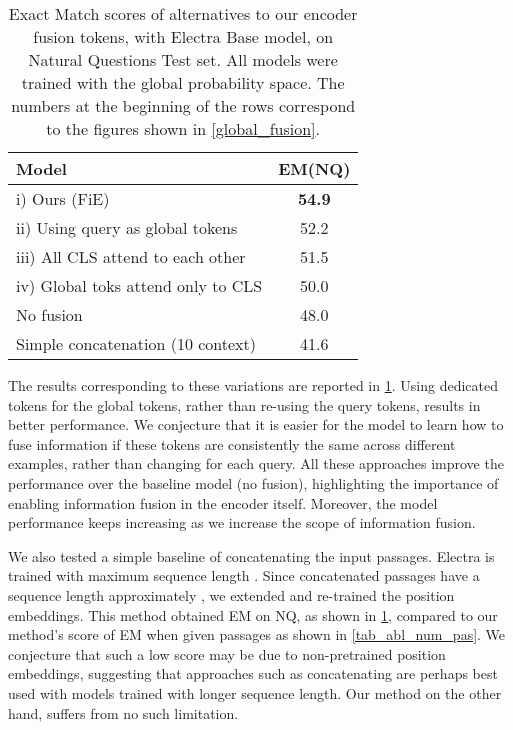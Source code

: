 \documentclass[11pt]{article}
\begin{document}
\begin{table}[h!]
\begin{center}
\begin{tabular}{lc}
\toprule
\textbf{Model} & \textbf{EM(NQ)}\\ 
\toprule 
i) Ours (FiE) & \textbf{54.9} \\
ii) Using query as global tokens & 52.2 \\
iii) All CLS attend to each other & 51.5 \\
iv) Global toks attend only to CLS & 50.0 \\
No fusion & 48.0 \\
Simple concatenation (10 context) & 41.6 \\
\bottomrule
\end{tabular}
\end{center}
\caption{Exact Match scores of alternatives to our encoder fusion tokens, with Electra Base model, on Natural Questions Test set. All models were trained with the global probability space. The numbers at the beginning of the rows correspond to the figures shown in \cref{global_fusion}.}
\label{tab_alternatives_fusion}
\end{table}

The results corresponding to these variations are reported in \cref{tab_alternatives_fusion}. Using dedicated tokens for the global tokens, rather than re-using the query tokens, results in better performance. We conjecture that it is easier for the model to learn how to fuse information if these tokens are consistently the same across different examples, rather than changing for each query. All these approaches improve the performance over the baseline model (no fusion), highlighting the importance of enabling information fusion in the encoder itself. Moreover, the model performance keeps increasing as we increase the scope of information fusion.

We also tested a simple baseline of concatenating the input passages. Electra is trained with maximum sequence length . Since  concatenated passages have a sequence length approximately , we extended and re-trained the position embeddings. This method obtained  EM on NQ, as shown in \cref{tab_alternatives_fusion}, compared to our method's score of  EM when given  passages as shown in \cref{tab_abl_num_pas}. We conjecture that such a low score may be due to non-pretrained position embeddings, suggesting that approaches such as concatenating are perhaps best used with models trained with longer sequence length. Our method on the other hand, suffers from no such limitation.
\end{document}
